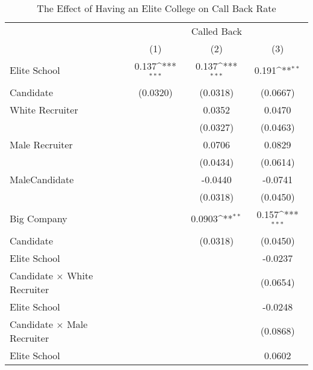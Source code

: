 \begin{table}[htbp]\centering
\def\sym#1{\ifmmode^{#1}\else\(^{#1}\)\fi}
\caption{\label{tab:assignment1} The Effect of Having an Elite College on Call Back Rate}
\begin{tabular*}{\hsize}{@{\hskip\tabcolsep\extracolsep\fill}l*{3}{c}}
\hline\hline
                    &\multicolumn{3}{c}{Called Back}                                  \\
                    &\multicolumn{1}{c}{(1)}         &\multicolumn{1}{c}{(2)}         &\multicolumn{1}{c}{(3)}         \\
\hline
Elite School        &       0.137\sym{***}&       0.137\sym{***}&       0.191\sym{**} \\
Candidate           &    (0.0320)         &    (0.0318)         &    (0.0667)         \\
[1em]
White Recruiter     &                     &      0.0352         &      0.0470         \\
                    &                     &    (0.0327)         &    (0.0463)         \\
[1em]
Male Recruiter      &                     &      0.0706         &      0.0829         \\
                    &                     &    (0.0434)         &    (0.0614)         \\
[1em]
MaleCandidate       &                     &     -0.0440         &     -0.0741         \\
                    &                     &    (0.0318)         &    (0.0450)         \\
[1em]
Big Company         &                     &      0.0903\sym{**} &       0.157\sym{***}\\
Candidate           &                     &    (0.0318)         &    (0.0450)         \\
[1em]
Elite School        &                     &                     &     -0.0237         \\
Candidate $\times$ White Recruiter&                     &                     &    (0.0654)         \\
[1em]
Elite School        &                     &                     &     -0.0248         \\
Candidate $\times$ Male Recruiter&                     &                     &    (0.0868)         \\
[1em]
Elite School        &                     &                     &      0.0602         \\

\end{tabular*}
\end{table}
